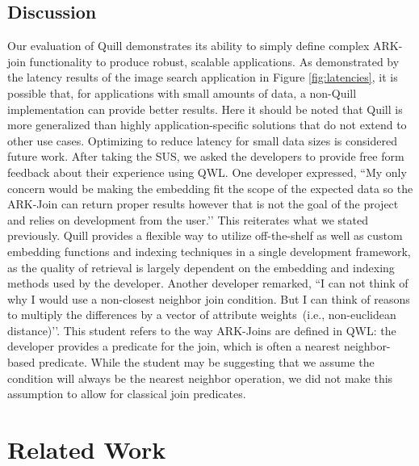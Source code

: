 \documentclass[11pt]{article}
\begin{document}
\subsection{Discussion}
Our evaluation of Quill demonstrates its ability to simply define complex ARK-join functionality to produce robust, scalable applications.
As demonstrated by the latency results of the image search application in Figure \ref{fig:latencies}, it is possible that, for applications with small amounts of data, a non-Quill implementation can provide better results.
Here it should be noted that Quill is more generalized than highly application-specific solutions that do not extend to other use cases. Optimizing to reduce latency for small data sizes is considered future work. After taking the SUS, we asked the developers to provide free form feedback about their experience using QWL.
One developer expressed, ``My only concern would be making the embedding fit the scope of the expected data so the ARK-Join can return proper results however that is not the goal of the project and relies on development from the user.’’
This reiterates what we stated previously.
Quill provides a flexible way to utilize off-the-shelf as well as custom embedding functions and indexing techniques in a single development framework, as the quality of retrieval is largely dependent on the embedding and indexing methods used by the developer.
Another developer remarked, ``I can not think of why I would use a non-closest neighbor join condition. But I can think of reasons to multiply the differences by a vector of attribute weights~(i.e., non-euclidean distance)’’.
This student refers to the way ARK-Joins are defined in QWL: the developer provides a predicate for the join, which is often a nearest neighbor-based predicate.
While the student may be suggesting that we assume the condition will always be the nearest neighbor operation, we did not make this assumption to allow for classical join predicates.



\section{Related Work}
\end{document}
